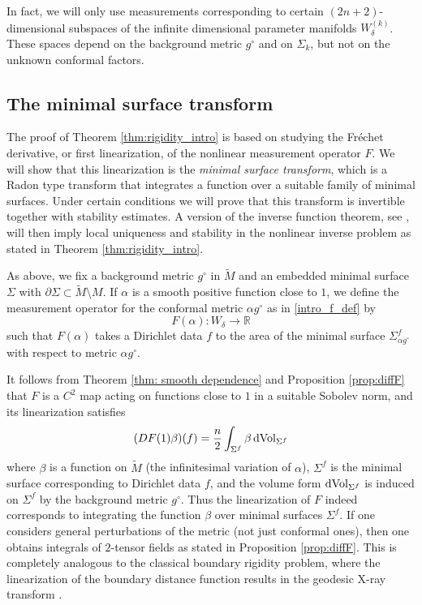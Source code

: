\documentclass[11pt]{amsart}
\theoremstyle{definition}
\numberwithin{equation}{section}
\newcommand{\mR}{\mathbb{R}}                    %
\newcommand{\p}{\partial}
\begin{document}
In fact, we will only use measurements corresponding to certain $(2n+2)$-dimensional subspaces of the infinite dimensional parameter manifolds $W_{\delta}^{(k)}$. These spaces depend on the background metric $g^{\circ}$ and on $\Sigma_k$, but not on the unknown conformal factors.


\subsection*{The minimal surface transform}

The proof of Theorem \ref{thm:rigidity_intro} is based on studying the Fr\'echet derivative, or first linearization, of the nonlinear measurement operator $F$. We will show that this linearization is the \emph{minimal surface transform}, which is a Radon type transform that integrates a function over a suitable family of minimal surfaces. Under certain conditions we will prove that this transform is invertible together with stability estimates. A version of the inverse function theorem, see \cite{stefanov2009linearizing}, will then imply local uniqueness and stability in the nonlinear inverse problem as stated in Theorem \ref{thm:rigidity_intro}.

As above, we fix a background metric ${g}^{\circ}$ in $\widetilde{M}$ and an embedded minimal surface $\Sigma$ with $\p \Sigma \subset \widetilde M \setminus M$. If $\alpha$ is a smooth positive function close to $1$, we define the measurement operator for the conformal metric $\alpha {g}^{\circ}$ as in \eqref{intro_f_def} by 
\[
F(\alpha): W_{\delta} \to \mR
\]
such that $F(\alpha)$ takes a Dirichlet data $f$ to the area of the minimal surface $\Sigma_{\alpha {g}^{\circ}}^f$ with respect to metric $\alpha {g}^{\circ}$.

It follows from Theorem \ref{thm: smooth dependence} and Proposition \ref{prop:diffF} that $F$ is a $C^2$ map acting on functions close to $1$ in a suitable Sobolev norm, and its linearization satisfies 
\[
(DF(1)\beta)(f) = \frac{n}{2} \int_{\Sigma^f} \beta \,{\rm dVol}_{\Sigma^f}
\]
where $\beta$ is a function on $\widetilde{M}$ (the infinitesimal variation of $\alpha$), $\Sigma^f$ is the minimal surface corresponding to Dirichlet data $f$, and the volume form ${\rm dVol}_{\Sigma^f}$ is induced on $\Sigma^f$ by the background metric ${g}^{\circ}$. Thus the linearization of $F$ indeed corresponds to integrating the function $\beta$ over minimal surfaces $\Sigma^f$. If one considers general perturbations of the metric (not just conformal ones), then one obtains integrals of $2$-tensor fields as stated in Proposition \ref{prop:diffF}. This is completely analogous to the classical boundary rigidity problem, where the linearization of the boundary distance function results in the geodesic X-ray transform \cite[Chapter 11]{zbMATH07625517}.
\end{document}
